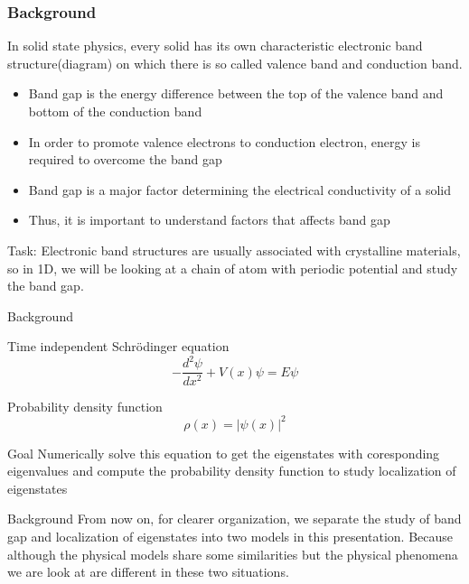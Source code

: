 \documentclass{beamer}
\begin{document}
\begin{frame}
\frametitle{Background}
In solid state physics, every solid has its own characteristic electronic band structure(diagram) on which there is so called valence band and conduction band. 
\begin{itemize}
    \item Band gap is the energy difference between the top of the valence band and bottom of the conduction band
    \item In order to promote valence electrons to conduction electron, energy is required to overcome the band gap 
    \item Band gap is a major factor determining the electrical conductivity of a solid
    \item Thus, it is important to understand factors that affects band gap
\end{itemize}
Task: Electronic band structures are usually associated with crystalline materials, so in 1D,  we will be looking at a chain of atom with periodic potential and study the band gap. 

\end{frame}

\begin{frame}{Background}
    
    \begin{block}{ Time independent Schr\"{o}dinger equation}
    \begin{equation} \label{eq:2.1}
-\frac{d^2\psi}{dx^2}+V(x)\psi=E\psi              
\end{equation}
\end{block}

    \begin{block}{ Probability density function}
    \begin{equation} \label{eq:2}
    \rho (x) = |\psi(x)|^2
\end{equation}
\end{block}
\begin{block}{Goal}
Numerically solve this equation to get the eigenstates with coresponding eigenvalues and compute the probability density function to study localization of eigenstates

\end{block}

\end{frame}

\begin{frame}{Background}
    From now on, for clearer organization, we separate the study of band gap and localization of eigenstates into two models in this presentation. 
    \newline
    Because although the physical models share some similarities but the physical phenomena we are look at are different in these two situations.
\end{frame}
\end{document}
